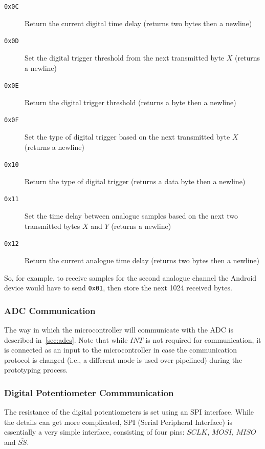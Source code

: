 \begin{description}
  \item[\texttt{0x0C}] Return the current digital time delay (returns two bytes
    then a newline)

  \item[\texttt{0x0D}] Set the digital trigger threshold from the next
    transmitted byte $X$ (returns a newline)

  \item[\texttt{0x0E}] Return the digital trigger threshold (returns a byte then
    a newline)

  \item[\texttt{0x0F}] Set the type of digital trigger based on the next
    transmitted byte $X$ (returns a newline)

  \item[\texttt{0x10}] Return the type of digital trigger (returns a data byte
    then a newline)

  \item[\texttt{0x11}] Set the time delay between analogue samples based on the
    next two transmitted bytes $X$ and $Y$ (returns a newline)

  \item[\texttt{0x12}] Return the current analogue time delay (returns two bytes
    then a newline)

\end{description}

So, for example, to receive samples for the second analogue channel the Android
device would have to send \texttt{0x01}, then store the next 1024 received bytes.

\subsubsection{ADC Communication}
The way in which the microcontroller will communicate with the ADC is described
in~\cref{sec:adcs}. Note that while $INT$ is not required for communication, it
is connected as an input to the microcontroller in case the communication
protocol is changed (i.e., a different mode is used over pipelined) during the
prototyping process.

\subsubsection{Digital Potentiometer Commmunication}

The resistance of the digital potentiometers is set using an SPI interface.
While the details can get more complicated, SPI (Serial Peripheral Interface) is
essentially a very simple interface, consisting of four pins: $SCLK$, $MOSI$,
$MISO$ and $\overline{SS}$.

